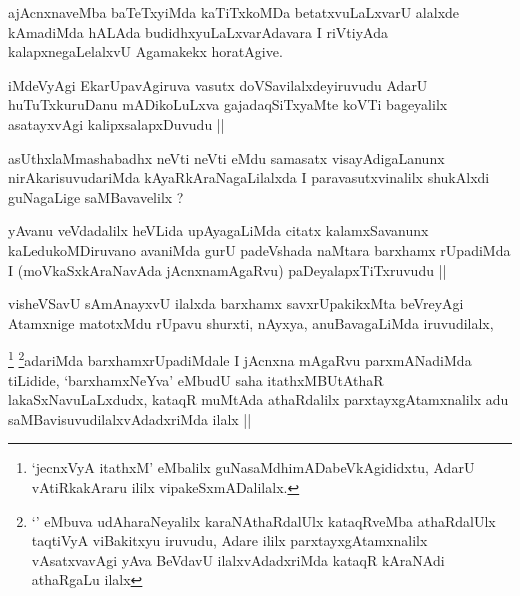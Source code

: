
\begin{artha}
ajAcnxnaveMba baTeTxyiMda kaTiTxkoMDa betatxvuLaLxvarU alalxde
kAmadiMda hALAda budidhxyuLaLxvarAdavara I riVtiyAda
kalapxnegaLelalxvU Agamakekx horatAgive.
\end{artha}

\begin{artha}
iMdeVyAgi EkarUpavAgiruva vasutx doVSavilalxdeyiruvudu AdarU
huTuTxkuruDanu mADikoLuLxva gajadaqSiTxyaMte koVTi bageyalilx
asatayxvAgi kalipxsalapxDuvudu ||
\end{artha}


\begin{artha}
asUthxlaMmashabadhx neVti neVti eMdu samasatx visayAdigaLanunx
nirAkarisuvudariMda kAyaRkAraNagaLilalxda I paravasutxvinalilx
shukAlxdi guNagaLige saMBavavelilx ?
\end{artha}


\begin{artha}
yAvanu veVdadalilx heVLida upAyagaLiMda citatx kalamxSavanunx
kaLedukoMDiruvano avaniMda gurU padeVshada naMtara barxhamx rUpadiMda
I (moVkaSxkAraNavAda jAcnxnamAgaRvu) paDeyalapxTiTxruvudu ||
\end{artha}

\begin{artha}
visheVSavU sAmAnayxvU ilalxda barxhamx savxrUpakikxMta beVreyAgi
Atamxnige matotxMdu rUpavu shurxti, nAyxya, anuBavagaLiMda
iruvudilalx,  
\end{artha}

\begin{artha}
\footnote{`jecnxVyA itathxM' eMbalilx guNasaMdhimADabeVkAgididxtu,
  AdarU vAtiRkakAraru ililx vipakeSxmADalilalx.}
\footnote{`\stext' eMbuva udAharaNeyalilx karaNAthaRdalUlx kataqRveMba
  athaRdalUlx taqtiVyA viBakitxyu iruvudu, Adare ililx
  parxtayxgAtamxnalilx vAsatxvavAgi yAva BeVdavU ilalxvAdadxriMda
  kataqR kAraNAdi athaRgaLu ilalx}adariMda barxhamxrUpadiMdale I jAcnxna mAgaRvu parxmANadiMda
tiLidide, `barxhamxNeYva' eMbudU saha itathxMBUtAthaR
lakaSxNavuLaLxdudx, kataqR muMtAda athaRdalilx parxtayxgAtamxnalilx
adu saMBavisuvudilalxvAdadxriMda ilalx ||
\end{artha}

